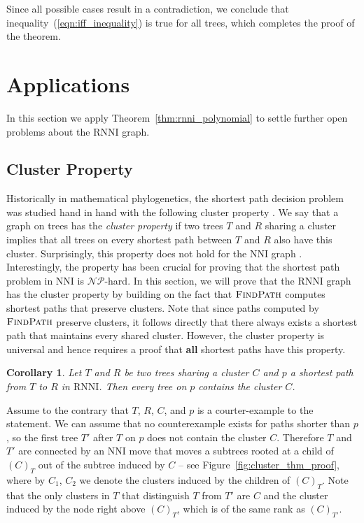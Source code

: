 \documentclass[11pt]{amsart}
\newtheorem{corollary}{Corollary}
\newcommand{\rnni}{\mathrm{RNNI}}
\newcommand{\findpath}{\textsc{FindPath}}
\newcommand{\nni}{\mathrm{NNI}}
\newcommand{\np}{\mathcal{NP}}
\newcommand{\summary}[1]{} %
\begin{document}
Since all possible cases result in a contradiction, we conclude that inequality~(\ref{eqn:iff_inequality}) is true for all trees, which completes the proof of the theorem.
\endproof


\section{Applications}

In this section we apply Theorem~\ref{thm:rnni_polynomial} to settle further open problems about the $\rnni$ graph.

\subsection{Cluster Property}

\summary{Some words on the cluster property}
Historically in mathematical phylogenetics, the shortest path decision problem was studied hand in hand with the following cluster property \autocite{Dasgupta2000-xa}.
We say that a graph on trees has the \emph{cluster property} if two trees $T$ and $R$ sharing a cluster implies that all trees on every shortest path between $T$ and $R$ also have this cluster.
Surprisingly, this property does not hold for the $\nni$ graph \autocite{Li1996-zw}.
Interestingly, the property has been crucial for proving \autocite{Dasgupta2000-xa} that the shortest path problem in $\nni$ is $\np$-hard.
In this section, we will prove that the $\rnni$ graph has the cluster property by building on the fact that $\findpath$ computes shortest paths that preserve clusters.
Note that since paths computed by $\findpath$ preserve clusters, it follows directly that there always exists a shortest path that maintains every shared cluster.
However, the cluster property is universal and hence requires a proof that \textbf{all} shortest paths have this property.

\summary{Proving the Cluster Property for $\rnni$}

\begin{corollary}
Let $T$ and $R$ be two trees sharing a cluster $C$ and $p$ a shortest path from $T$ to $R$ in $\rnni$.
Then every tree on $p$ contains the cluster $C$.
\label{cluster_thm}
\end{corollary}

\proof
Assume to the contrary that $T$, $R$, $C$, and $p$ is a courter-example to the statement.
We can assume that no counterexample exists for paths shorter than $p$, so the first tree $T'$ after $T$ on $p$ does not contain the cluster $C$.
Therefore $T$ and $T'$ are connected by an $\nni$ move that moves a subtrees rooted at a child of $(C)_T$ out of the subtree induced by $C$ -- see Figure~\ref{fig:cluster_thm_proof}, where by $C_1$, $C_2$ we denote the clusters induced by the children of $(C)_T$.
Note that the only clusters in $T$ that distinguish $T$ from $T'$ are $C$ and the cluster induced by the node right above $(C)_{T}$, which is of the same rank as $(C)_{T'}$.
\end{document}
